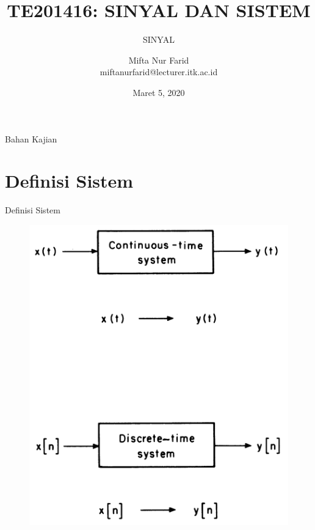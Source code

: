 \documentclass[aspectratio=169]{beamer}
\author{Mifta Nur Farid \\
	miftanurfarid@lecturer.itk.ac.id}
\title{TE201416: SINYAL DAN SISTEM}
\subtitle{SINYAL}
\institute{Teknik Elektro \\ Institut Teknologi Kalimantan \\ Balikpapan, Indonesia}
\date{\tiny Maret 5, 2020}
\begin{document}
\begin{frame}[t,plain]
\titlepage
\end{frame}

\begin{frame}{Bahan Kajian}
    \tableofcontents[subsectionstyle=hide]
\end{frame}

\section{Definisi Sistem}
\begin{frame}{Definisi Sistem}
	\begin{figure}
		\centering
		\includegraphics[height=0.8\textheight]{gambar/02.sistem/02.slide_09}
	\end{figure}
\end{frame}
\end{document}
